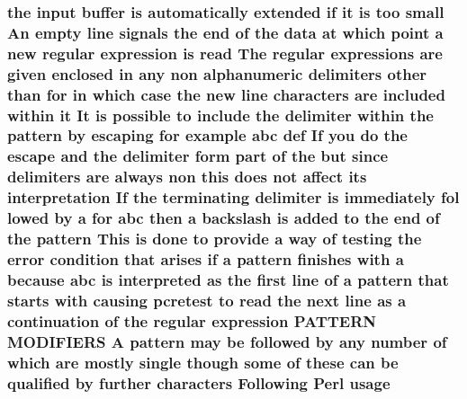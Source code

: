 \subsubsection[{\texorpdfstring{usage}{usage}}]{\setlength{\rightskip}{0pt plus 5cm}the {\bf input} {\bf buffer} {\bf is} automatically extended {\bf if} {\bf it} {\bf is} too small An {\bf empty} {\bf line} signals the {\bf end} {\bf of} the {\bf data} at {\bf which} {\bf point} {\bf a} new regular {\bf expression} {\bf is} {\bf read} The regular {\bf expressions} {\bf are} {\bf given} enclosed {\bf in} {\bf any} non {\bf alphanumeric} delimiters other {\bf than} for {\bf in} {\bf which} {\bf case} the new {\bf line} {\bf characters} {\bf are} {\bf included} within {\bf it} It {\bf is} {\bf possible} {\bf to} {\bf include} the delimiter within the {\bf pattern} by escaping for {\bf example} {\bf abc} def If you {\bf do} the escape and the delimiter form part {\bf of} the but since delimiters {\bf are} always non {\bf this} does {\bf not} affect its interpretation If the terminating delimiter {\bf is} immediately fol lowed by {\bf a} for {\bf abc} then {\bf a} {\bf backslash} {\bf is} added {\bf to} the {\bf end} {\bf of} the {\bf pattern} This {\bf is} {\bf done} {\bf to} provide {\bf a} {\bf way} {\bf of} testing the {\bf error} condition that {\bf arises} {\bf if} {\bf a} {\bf pattern} finishes {\bf with} {\bf a} because {\bf abc} {\bf is} interpreted {\bf as} the {\bf first} {\bf line} {\bf of} {\bf a} {\bf pattern} that starts {\bf with} causing {\bf pcretest} {\bf to} {\bf read} the next {\bf line} {\bf as} {\bf a} continuation {\bf of} the regular {\bf expression} P\+A\+T\+T\+E\+RN M\+O\+D\+I\+F\+I\+E\+RS {\bf A} {\bf pattern} may {\bf be} followed by {\bf any} {\bf number} {\bf of} {\bf which} {\bf are} mostly single {\bf though} some {\bf of} these {\bf can} {\bf be} qualified by further {\bf characters} Following {\bf Perl} usage}\hypertarget{pcretest_8txt_a8ffbf583da894183f2ae1ce86d806ca3}{}\label{pcretest_8txt_a8ffbf583da894183f2ae1ce86d806ca3}
